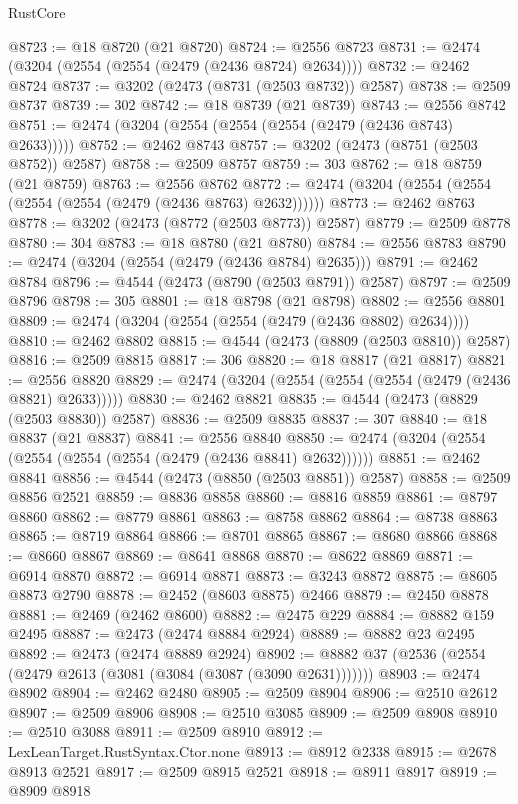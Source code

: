 \begin{lexlean}{RustCore}
\begin{coremodule}
@8723 := @18 @8720 (@21 @8720)
@8724 := @2556 @8723
@8731 := @2474 (@3204 (@2554 (@2554 (@2479 (@2436 @8724) @2634))))
@8732 := @2462 @8724
@8737 := @3202 (@2473 (@8731 (@2503 @8732)) @2587)
@8738 := @2509 @8737
@8739 := 302
@8742 := @18 @8739 (@21 @8739)
@8743 := @2556 @8742
@8751 := @2474 (@3204 (@2554 (@2554 (@2554 (@2479 (@2436 @8743) @2633)))))
@8752 := @2462 @8743
@8757 := @3202 (@2473 (@8751 (@2503 @8752)) @2587)
@8758 := @2509 @8757
@8759 := 303
@8762 := @18 @8759 (@21 @8759)
@8763 := @2556 @8762
@8772 := @2474 (@3204 (@2554 (@2554 (@2554 (@2554 (@2479 (@2436 @8763) @2632))))))
@8773 := @2462 @8763
@8778 := @3202 (@2473 (@8772 (@2503 @8773)) @2587)
@8779 := @2509 @8778
@8780 := 304
@8783 := @18 @8780 (@21 @8780)
@8784 := @2556 @8783
@8790 := @2474 (@3204 (@2554 (@2479 (@2436 @8784) @2635)))
@8791 := @2462 @8784
@8796 := @4544 (@2473 (@8790 (@2503 @8791)) @2587)
@8797 := @2509 @8796
@8798 := 305
@8801 := @18 @8798 (@21 @8798)
@8802 := @2556 @8801
@8809 := @2474 (@3204 (@2554 (@2554 (@2479 (@2436 @8802) @2634))))
@8810 := @2462 @8802
@8815 := @4544 (@2473 (@8809 (@2503 @8810)) @2587)
@8816 := @2509 @8815
@8817 := 306
@8820 := @18 @8817 (@21 @8817)
@8821 := @2556 @8820
@8829 := @2474 (@3204 (@2554 (@2554 (@2554 (@2479 (@2436 @8821) @2633)))))
@8830 := @2462 @8821
@8835 := @4544 (@2473 (@8829 (@2503 @8830)) @2587)
@8836 := @2509 @8835
@8837 := 307
@8840 := @18 @8837 (@21 @8837)
@8841 := @2556 @8840
@8850 := @2474 (@3204 (@2554 (@2554 (@2554 (@2554 (@2479 (@2436 @8841) @2632))))))
@8851 := @2462 @8841
@8856 := @4544 (@2473 (@8850 (@2503 @8851)) @2587)
@8858 := @2509 @8856 @2521
@8859 := @8836 @8858
@8860 := @8816 @8859
@8861 := @8797 @8860
@8862 := @8779 @8861
@8863 := @8758 @8862
@8864 := @8738 @8863
@8865 := @8719 @8864
@8866 := @8701 @8865
@8867 := @8680 @8866
@8868 := @8660 @8867
@8869 := @8641 @8868
@8870 := @8622 @8869
@8871 := @6914 @8870
@8872 := @6914 @8871
@8873 := @3243 @8872
@8875 := @8605 @8873 @2790
@8878 := @2452 (@8603 @8875) @2466
@8879 := @2450 @8878
@8881 := @2469 (@2462 @8600)
@8882 := @2475 @229
@8884 := @8882 @159 @2495
@8887 := @2473 (@2474 @8884 @2924)
@8889 := @8882 @23 @2495
@8892 := @2473 (@2474 @8889 @2924)
@8902 := @8882 @37 (@2536 (@2554 (@2479 @2613 (@3081 (@3084 (@3087 (@3090 @2631)))))))
@8903 := @2474 @8902
@8904 := @2462 @2480
@8905 := @2509 @8904
@8906 := @2510 @2612
@8907 := @2509 @8906
@8908 := @2510 @3085
@8909 := @2509 @8908
@8910 := @2510 @3088
@8911 := @2509 @8910
@8912 := LexLeanTarget.RustSyntax.Ctor.none
@8913 := @8912 @2338
@8915 := @2678 @8913 @2521
@8917 := @2509 @8915 @2521
@8918 := @8911 @8917
@8919 := @8909 @8918

\end{coremodule}
\end{lexlean}
